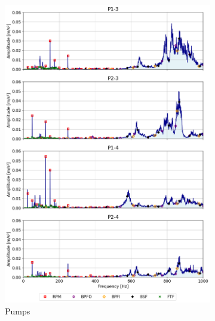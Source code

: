 \begin{figure}[h]
\begin{subfigure}[b]{0.24\textwidth}
        \includegraphics[width=\textwidth]{assets/results/defects/pumps.png}
        \caption{Pumps}
    \end{subfigure}
    \hfill
    \begin{subfigure}[b]{0.24\textwidth}

\end{subfigure}
\end{figure}
